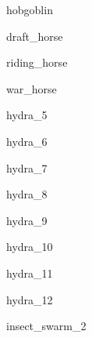 \documentclass[letterpaper,serif]{module}
\begin{document}
\begin{newmonster}{hobgoblin}\end{newmonster}


\begin{newmonster}{draft_horse}\end{newmonster}

\begin{newmonster}{riding_horse}\end{newmonster}

\begin{newmonster}{war_horse}\end{newmonster}


\begin{newmonster}{hydra_5}\end{newmonster}

\begin{newmonster}{hydra_6}\end{newmonster}

\begin{newmonster}{hydra_7}\end{newmonster}

\begin{newmonster}{hydra_8}\end{newmonster}

\begin{newmonster}{hydra_9}\end{newmonster}

\begin{newmonster}{hydra_10}\end{newmonster}

\begin{newmonster}{hydra_11}\end{newmonster}

\begin{newmonster}{hydra_12}\end{newmonster}


\begin{newmonster}{insect_swarm_2}\end{newmonster}
\end{document}
